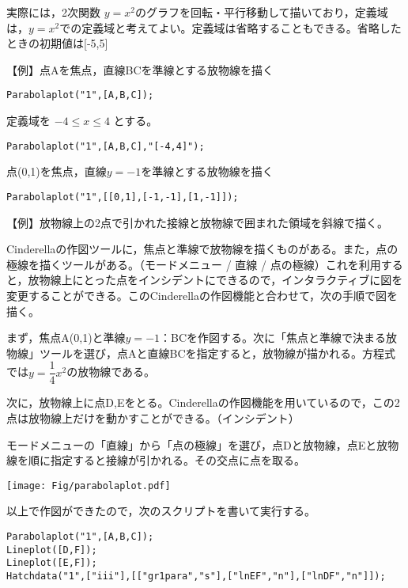 \documentclass[papersize,a4paper,10pt,uplatex]{jsarticle}
\begin{document}
\begin{description}
実際には，2次関数 $y=x^2$のグラフを回転・平行移動して描いており，定義域は，$y=x^2$での定義域と考えてよい。定義域は省略することもできる。省略したときの初期値は[-5,5]

\vspace{\baselineskip}
【例】点Aを焦点，直線BCを準線とする放物線を描く

\hspace{10mm}\verb|Parabolaplot("1",[A,B,C]); |

定義域を $-4 \leq x \leq 4$ とする。

\hspace{10mm} \verb|Parabolaplot("1",[A,B,C],"[-4,4]");|

点(0,1)を焦点，直線$y=-1$を準線とする放物線を描く

\hspace{10mm} \verb|Parabolaplot("1",[[0,1],[-1,-1],[1,-1]]);|

\vspace{\baselineskip}
【例】放物線上の2点で引かれた接線と放物線で囲まれた領域を斜線で描く。

Cinderellaの作図ツールに，焦点と準線で放物線を描くものがある。また，点の極線を描くツールがある。（モードメニュー / 直線 / 点の極線）これを利用すると，放物線上にとった点をインシデントにできるので，インタラクティブに図を変更することができる。このCinderellaの作図機能と合わせて，次の手順で図を描く。

まず，焦点A(0,1)と準線$y=-1$：BCを作図する。次に「焦点と準線で決まる放物線」ツールを選び，点Aと直線BCを指定すると，放物線が描かれる。方程式では$y=\dfrac{1}{4}x^2$の放物線である。

次に，放物線上に点D,Eをとる。Cinderellaの作図機能を用いているので，この2点は放物線上だけを動かすことができる。（インシデント）

モードメニューの「直線」から「点の極線」を選び，点Dと放物線，点Eと放物線を順に指定すると接線が引かれる。その交点に点を取る。

\vspace{\baselineskip}
\begin{center} \texttt{[image: Fig/parabolaplot.pdf]} \end{center}

\vspace{\baselineskip}
以上で作図ができたので，次のスクリプトを書いて実行する。
\begin{verbatim}
Parabolaplot("1",[A,B,C]);
Lineplot([D,F]);
Lineplot([E,F]);
Hatchdata("1",["iii"],[["gr1para","s"],["lnEF","n"],["lnDF","n"]]);
\end{verbatim}


\end{description}
\end{document}
